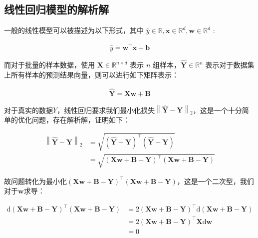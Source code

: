 \documentclass[UTF8]{book}
\begin{document}
\subsection{线性回归模型的解析解}
一般的线性模型可以被描述为以下形式，其中 $\hat{y}\in \mathbb{R}, \mathbf{x}\in \mathbb{R}^d, \mathbf{w}\in \mathbb{R}^d$ :
\begin{large}
    \begin{equation}
        \begin{aligned}
            \hat{y}= \mathbf{w}^\top \mathbf{x}+\mathbf{b}
            \nonumber
        \end{aligned}
    \end{equation}
\end{large}
而对于批量的样本数据，使用 $\mathbf{X}\in \mathbb{R}^{n\times d}$ 表示 $n$ 组样本，$\hat{\mathbf{Y}}\in \mathbb{R}^{n}$ 表示对于数据集上所有样本的预测结果向量，则可以进行如下矩阵表示：
\begin{large}
    \begin{equation}
        \begin{aligned}
            \hat{\mathbf{Y}}=\mathbf{X}\mathbf{w}+\mathbf{B}
            \nonumber
        \end{aligned}
    \end{equation}
\end{large}
对于真实的数据$Y$，线性回归要求我们最小化损失$\left \| \hat{\mathbf{Y}}-\mathbf{Y} \right \|_2$，这是一个十分简单的优化问题，存在解析解，证明如下：
\begin{large}
    \begin{equation}
        \begin{aligned}
            \left \| \hat{\mathbf{Y}}-\mathbf{Y} \right \|_2 &= \sqrt{(\hat{\mathbf{Y}}-\mathbf{Y})^\top(\hat{\mathbf{Y}}-\mathbf{Y})} \\
            &= \sqrt{(\mathbf{X}\mathbf{w}+\mathbf{B}-\mathbf{Y})^\top(\mathbf{X}\mathbf{w}+\mathbf{B}-\mathbf{Y})}
            \nonumber
        \end{aligned}
    \end{equation}
\end{large}
故问题转化为最小化$(\mathbf{X}\mathbf{w}+\mathbf{B}-\mathbf{Y})^\top(\mathbf{X}\mathbf{w}+\mathbf{B}-\mathbf{Y})$，这是一个二次型，我们对于$\mathbf{w}$求导：
\begin{large}
    \begin{equation}
        \begin{aligned}
            \mathrm{d}(\mathbf{X}\mathbf{w}+\mathbf{B}-\mathbf{Y})^\top(\mathbf{X}\mathbf{w}+\mathbf{B}-\mathbf{Y}) &= 2(\mathbf{X}\mathbf{w}+\mathbf{B}-\mathbf{Y})^\top\mathrm{d}(\mathbf{X}\mathbf{w}+\mathbf{B}-\mathbf{Y}) \\
            &= 2(\mathbf{X}\mathbf{w}+\mathbf{B}-\mathbf{Y})^\top\mathbf{X}\mathrm{d}\mathbf{w} \\
            &= 0
            \nonumber
        \end{aligned}
    \end{equation}
\end{large}
\end{document}
